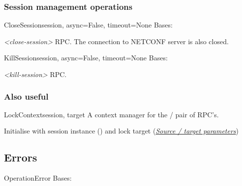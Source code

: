 \documentclass[a4paper,10pt,english]{manual}
\begin{document}
\subsubsection{Session management operations}

\hypertarget{ncclient.operations.CloseSession}{}\begin{classdesc}{CloseSession}{session, async=False, timeout=None}
Bases: \hyperlink{ncclient.operations.rpc.RPC}{}

\emph{\textless{}close-session\textgreater{}} RPC. The connection to NETCONF server is also closed.
\end{classdesc}

\hypertarget{ncclient.operations.KillSession}{}\begin{classdesc}{KillSession}{session, async=False, timeout=None}
Bases: \hyperlink{ncclient.operations.rpc.RPC}{}

\emph{\textless{}kill-session\textgreater{}} RPC.
\end{classdesc}


\subsubsection{Also useful}

\hypertarget{ncclient.operations.LockContext}{}\begin{classdesc}{LockContext}{session, target}
A context manager for the \hyperlink{ncclient.operations.Lock}{} / \hyperlink{ncclient.operations.Unlock}{} pair of RPC's.

Initialise with session instance (\hyperlink{ncclient.transport.Session}{}) and lock target (\hyperlink{source-target}{\emph{Source / target parameters}})
\end{classdesc}


\subsection{Errors}

\hypertarget{ncclient.operations.OperationError}{}\begin{excdesc}{OperationError}
Bases: 
\end{excdesc}
\end{document}
